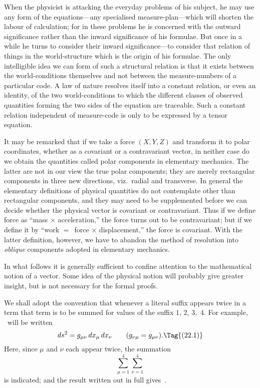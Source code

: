 \documentclass[12pt]{book}
\begin{document}
When the physicist is attacking the everyday problems of his subject, he
may use any form of the equations---any specialised measure\hyp{}plan---which
will shorten the labour of calculation; for in these problems he is concerned
with the outward significance rather than the inward significance of his
formulae. But once in a while he turns to consider their inward significance---to
consider that relation of things in the world\hyp{}structure which is the
origin of his formulae. The only intelligible idea we can form of such a
structural relation is that it exists between the world\hyp{}conditions themselves
and not between the measure\hyp{}numbers of a particular code. A law of nature
resolves itself into a constant relation, or even an identity, of the two world\hyp{}conditions
to which the different classes of observed quantities forming the
two sides of the equation are traceable. Such a constant relation independent
of measure\hyp{}code is only to be expressed by a tensor equation.

It may be remarked that if we take a force $(X, Y, Z)$ and transform it to
%
polar coordinates, whether as a covariant or a contravariant vector, in neither
case do we obtain the quantities called polar components in elementary
mechanics. The latter are not in our view the true polar components; they
are merely rectangular components in three new directions, viz.\ radial and
transverse. In general the elementary definitions of physical quantities do
not contemplate other than rectangular components, and they may need to
be supplemented before we can decide whether the physical vector is covariant
or contravariant. Thus if we define force as ``mass $\times$ acceleration,'' the force
turns out to be contravariant; but if we define it by ``work $=$~force $\times$ displacement,''
the force is covariant. With the latter definition, however, we have
to abandon the method of resolution into \emph{oblique} components adopted in
elementary mechanics.

In what follows it is generally sufficient to confine attention to the mathematical
notion of a vector. Some idea of the physical notion will probably
give greater insight, but is not necessary for the formal proofs.

%

We shall adopt the convention that whenever a literal suffix appears twice
in a term that term is to be summed for values of the suffix $1$, $2$, $3$,~$4$. For
example, ~will be written
\[
ds^{2} = g_{\mu\nu}\, dx_{\mu}\, dx_{\nu}\qquad (g_{\nu\mu} = g_{\mu\nu}).
\Tag{(22.1)}
\]
Here, since $\mu$ and $\nu$ each appear twice, the summation
\[
\sum_{\mu=1}^{4} \sum_{\nu=1}^{4}
\]
is indicated; and the result written out in full gives~.
\end{document}

